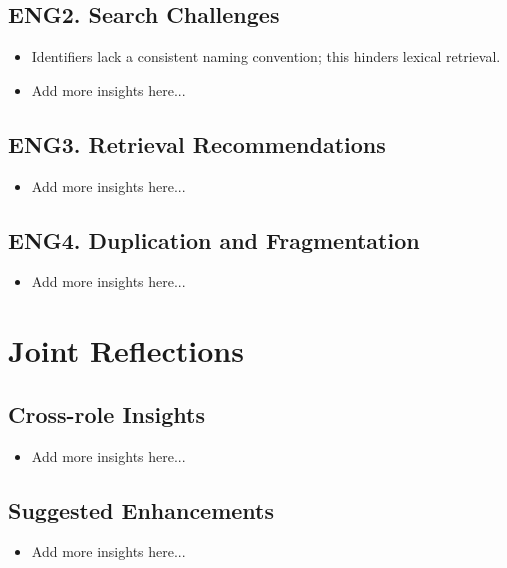 \subsection*{ENG2. Search Challenges}
\begin{itemize}
  \item Identifiers lack a consistent naming convention; this hinders lexical retrieval.
  \item Add more insights here...
\end{itemize}

\subsection*{ENG3. Retrieval Recommendations}
\begin{itemize}
  \item Add more insights here...
\end{itemize}

\subsection*{ENG4. Duplication and Fragmentation}
\begin{itemize}
  \item Add more insights here...
\end{itemize}

\section{Joint Reflections}

\subsection*{Cross-role Insights}
\begin{itemize}
  \item Add more insights here...
\end{itemize}

\subsection*{Suggested Enhancements}
\begin{itemize}
  \item Add more insights here...
\end{itemize}
